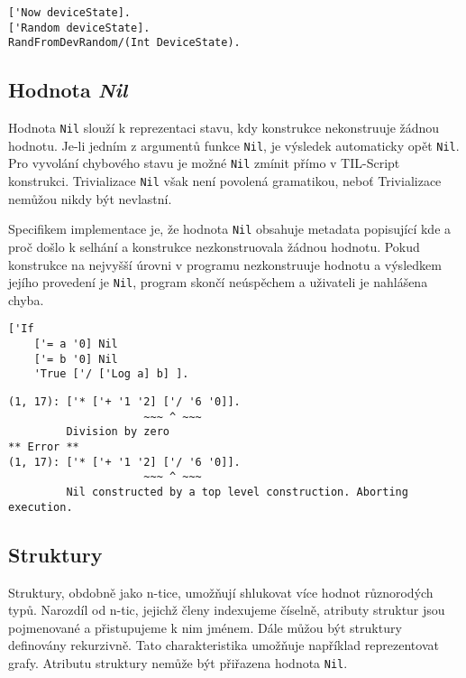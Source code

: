 \begin{lstlisting}[caption={Příklad funkcí závislých na stavu zařízení}]
['Now deviceState].
['Random deviceState].
RandFromDevRandom/(Int DeviceState).
\end{lstlisting}

\subsection{Hodnota \textit{Nil}} \label{nil-value}

Hodnota \lstinline{Nil} slouží k reprezentaci stavu, kdy konstrukce nekonstruuje žádnou hodnotu.
Je-li jedním z argumentů funkce \lstinline{Nil}, je výsledek automaticky opět \lstinline{Nil}.
Pro vyvolání chybového stavu je možné \lstinline{Nil} zmínit přímo v TIL-Script konstrukci.
Trivializace \lstinline{Nil} však není povolená gramatikou, neboť Trivializace nemůžou nikdy
být nevlastní.

Specifikem implementace je, že hodnota \lstinline{Nil} obsahuje metadata popisující kde a proč
došlo k selhání a konstrukce nezkonstruovala žádnou hodnotu. Pokud konstrukce na nejvyšší úrovni
v programu nezkonstruuje hodnotu a výsledkem jejího provedení je \lstinline{Nil}, program skončí
neúspěchem a uživateli je nahlášena chyba.

\begin{lstlisting}[caption={Příklad využití Nil}]
['If
    ['= a '0] Nil
    ['= b '0] Nil
    'True ['/ ['Log a] b] ].
\end{lstlisting}

\begin{lstlisting}[caption={Příklad hlášení chyby}]
(1, 17): ['* ['+ '1 '2] ['/ '6 '0]].
                     ~~~ ^ ~~~
         Division by zero
** Error **
(1, 17): ['* ['+ '1 '2] ['/ '6 '0]].
                     ~~~ ^ ~~~
         Nil constructed by a top level construction. Aborting execution.
\end{lstlisting}

\subsection{Struktury} \label{structs}

Struktury, obdobně jako n-tice, umožňují shlukovat více hodnot různorodých typů. Narozdíl od n-tic,
jejichž členy indexujeme číselně, atributy struktur jsou pojmenované a přistupujeme k nim jménem.
Dále můžou být struktury definovány rekurzivně. Tato charakteristika umožňuje například
reprezentovat grafy. Atributu struktury nemůže být přiřazena hodnota \lstinline{Nil}.


